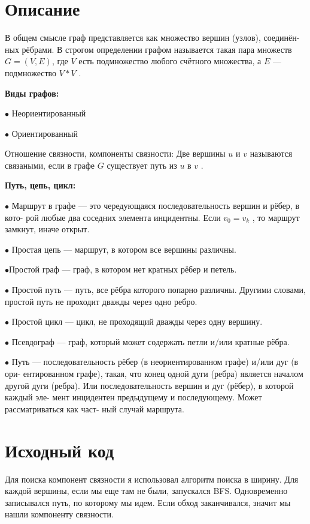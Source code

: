 \section{Описание}

В общем смысле граф представляется как множество вершин (узлов), соединён-
ных рёбрами. В строгом определении графом называется такая пара множеств $G =
(V, E)$, где $V$ есть подмножество любого счётного множества, а $E$ — подмножество $V * V$ .

\textbf{Виды графов:}

$\bullet$ Неориентированный

$\bullet$ Ориентированный

Отношение связности, компоненты связности:
Две вершины $u$ и $v$ называются связаными, если в графе $G$ существует путь из $u$ в
$v$ .

\textbf{Путь, цепь, цикл:}

$\bullet$ Маршрут в графе — это чередующаяся последовательность вершин и рёбер, в кото-
рой любые два соседних элемента инцидентны. Если $v_{0} = v_{k}$ , то маршрут замкнут,
иначе открыт.

$\bullet$ Простая цепь — маршрут, в котором все вершины различны.

$\bullet$Простой граф — граф, в котором нет кратных рёбер и петель.

$\bullet$ Простой путь — путь, все рёбра которого попарно различны. Другими словами,
простой путь не проходит дважды через одно ребро.

$\bullet$ Простой цикл — цикл, не проходящий дважды через одну вершину.

$\bullet$ Псевдограф — граф, который может содержать петли и/или кратные рёбра.

$\bullet$ Путь — последовательность рёбер (в неориентированном графе) и/или дуг (в ори-
ентированном графе), такая, что конец одной дуги (ребра) является началом другой
дуги (ребра). Или последовательность вершин и дуг (рёбер), в которой каждый эле-
мент инцидентен предыдущему и последующему. Может рассматриваться как част-
ный случай маршрута.

\pagebreak

\section{Исходный код}
Для поиска компонент связности я использовал алгоритм поиска в ширину. Для каждой вершины, если мы еще там не были, запускался BFS. Одновременно записывался путь, по которому мы идем. Если обход заканчивался, значит мы нашли компоненту связности. 

